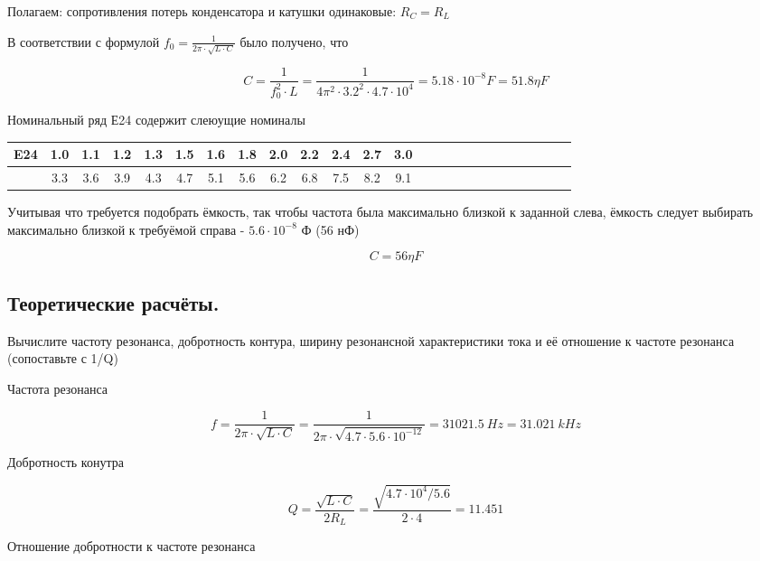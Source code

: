 \documentclass[12pt,a4paper]{article}
\begin{document}
			Полагаем: сопротивления потерь конденсатора и катушки одинаковые: $R_C = R_L$
			
			\medskip
			\medskip
			\medskip
			
			В соответствии с формулой $f_0 = \frac{1}{2\pi \cdot \sqrt{L \cdot C}}$ было получено, что
			
			\[C = \frac{1}{f_0^2 \cdot L} = \frac{1}{4\pi^2 \cdot 3.2^2 \cdot 4.7 \cdot 10^4} = 5.18\cdot 10^{-8} F = 51.8 \eta F\]
			
			\medskip
			\medskip
			
			Номинальный ряд Е24 содержит слеюущие номиналы
			
				\begin{tabular}{|c|c|c|c|c|c|c|c|c|c|c|c|c|c|c|c|c|c|c|c|c|c|c|c|c|}
						\hline
						E24 & 1.0 & 1.1 & 1.2 & 1.3 & 1.5 & 1.6 & 1.8 & 2.0 & 2.2 & 2.4 & 2.7 & 3.0 \\
						\hline
						& 3.3 & 3.6 & 3.9 & 4.3 & 4.7 & 5.1 & 5.6 & 6.2 & 6.8 & 7.5 & 8.2 & 9.1	\\
						\hline
				\end{tabular}
			
			\medskip
			\medskip
			
			Учитывая что требуется подобрать ёмкость, так чтобы частота была максимально близкой к заданной слева, ёмкость следует выбирать максимально близкой к требуёмой справа - $5.6 \cdot 10^{-8}$ Ф (56 нФ)
			
			\[C = 56 \eta F\]
			 
		\newpage
		
		\subsection{Теоретические расчёты.\newline}
		
		Вычислите частоту резонанса, добротность контура, ширину резонансной характеристики тока и её отношение к частоте резонанса (сопоставьте с 1/Q)
		
		Частота резонанса
		
		\[f = \frac{1}{2\pi \cdot \sqrt{L \cdot C}} = \frac{1}{2\pi \cdot \sqrt{4.7 \cdot 5.6 \cdot 10^{-12}}} = 31021.5 \ Hz = 31.021 \ kHz\]
		
		Добротность конутра
		
		\[Q = \frac{\sqrt{L \cdot C}}{2R_L} = \frac{\sqrt{4.7 \cdot 10^4 / 5.6 }}{2 \cdot 4} = 11.451\]
		
		Отношение добротности к частоте резонанса
		
\end{document}
